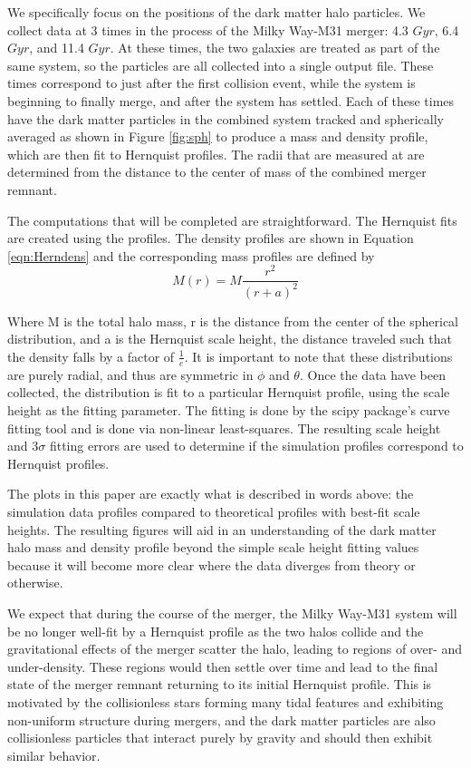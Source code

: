 \documentclass[linenumbers]{aastex631}
\begin{document}
We specifically focus on the positions of the dark matter halo particles. We collect data at 3 times in the process of the Milky Way-M31 merger: 4.3 $Gyr$, 6.4 $Gyr$, and 11.4 $Gyr$. At these times, the two galaxies are treated as part of the same system, so the particles are all collected into a single output file. These times correspond to just after the first collision event, while the system is beginning to finally merge, and after the system has settled. Each of these times have the dark matter particles in the combined system tracked and spherically averaged as shown in Figure \ref{fig:sph} to produce a mass and density profile, which are then fit to Hernquist profiles. The radii that are measured at are determined from the distance to the center of mass of the combined merger remnant.

The computations that will be completed are straightforward. The Hernquist fits are created using the \cite{Hernquist} profiles. The density profiles are shown in Equation \ref{eqn:Herndens} and the corresponding mass profiles are defined by
\begin{equation}
    M(r) = M\frac{r^2}{(r+a)^2}
\end{equation}

Where M is the total halo mass, r is the distance from the center of the spherical distribution, and a is the Hernquist scale height, the distance traveled such that the density falls by a factor of $\frac{1}{e}$. It is important to note that these distributions are purely radial, and thus are symmetric in $\phi$ and $\theta$. Once the data have been collected, the distribution is fit to a particular Hernquist profile, using the scale height as the fitting parameter. The fitting is done by the scipy package's curve fitting tool and is done via non-linear least-squares. The resulting scale height and 3$\sigma$ fitting errors are used to determine if the simulation profiles correspond to Hernquist profiles.

The plots in this paper are exactly what is described in words above: the simulation data profiles compared to theoretical profiles with best-fit scale heights. The resulting figures will aid in an understanding of the dark matter halo mass and density profile beyond the simple scale height fitting values because it will become more clear where the data diverges from theory or otherwise.

We expect that during the course of the merger, the Milky Way-M31 system will be no longer well-fit by a Hernquist profile as the two halos collide and the gravitational effects of the merger scatter the halo, leading to regions of over- and under-density. These regions would then settle over time and lead to the final state of the merger remnant returning to its initial Hernquist profile. This is motivated by the collisionless stars forming many tidal features and exhibiting non-uniform structure during mergers, and the dark matter particles are also collisionless particles that interact purely by gravity and should then exhibit similar behavior.
\end{document}
